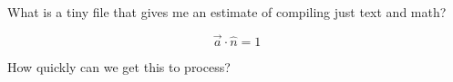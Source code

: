 
What is a tiny file that gives me an estimate of compiling just text and math? 

$$\vec{a} \cdot \hat{n} = 1$$

How quickly can we get this to process?

\bye
